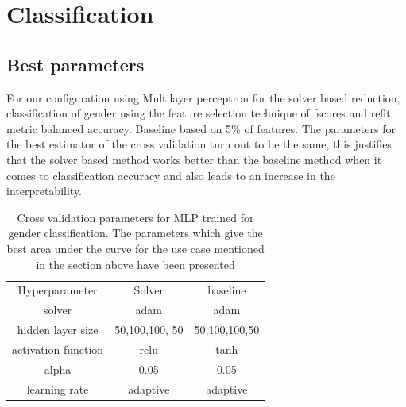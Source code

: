 \documentclass[msthesis.tex]{subfiles}
\begin{document}
\section{Classification}
\subsection{Best parameters}
For our configuration using Multilayer perceptron for the solver based reduction, classification of gender using the feature selection technique of fscores and refit metric balanced accuracy. Baseline based on 5\% of features.  The parameters for the best estimator of the cross validation turn out to be the same, this justifies that the solver based method works better than the baseline method when it comes to classification accuracy and also leads to an increase in the interpretability.
\begin{table}[]
    \centering
    \begin{tabular}{|c|c|c|}
        \hline
        Hyperparameter & Solver & baseline \\
        solver & adam & adam\\
        \hline
        hidden layer size &  50,100,100, 50 & 50,100,100,50\\
        \hline
        activation function & relu & tanh\\
        \hline
        alpha & 0.05 & 0.05\\
        \hline
        learning rate & adaptive & adaptive\\
        \hline
    \end{tabular}
    \caption{Cross validation parameters for MLP trained for gender classification. The parameters which give the best area under the curve for the use case mentioned in the section above have been presented}
    \label{tab:my_label}
\end{table}
\end{document}
